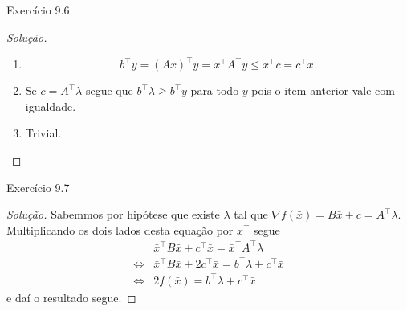 \documentclass[12pt,twoside,a4paper]{article}
\begin{document}
\begin{problema}
Exercício 9.6  
\end{problema}
\begin{proof}[Solução]
  \begin{enumerate}
  \item
    \[b^\top y = (Ax)^\top y = x^\top A^\top y  \leq x^\top c= c^\top x.\]
   \item Se \(c=A^\top \lambda\) segue que \(b^\top \lambda \geq b^\top y\) para
     todo \(y\) pois o item anterior vale com igualdade.
   \item Trivial.
    \end{enumerate}
\end{proof}
\begin{problema}
Exercício 9.7
\end{problema}
\begin{proof}[Solução]
 Sabemmos por hipótese que existe \(\lambda\) tal que \(\nabla
 f(\bar{x})=B\bar{x} + c = A^\top \lambda\). Multiplicando os dois lados desta
 equação por \(x^\top\) segue
 \begin{align*}
   & \bar{x}^\top B \bar{x} + c^\top \bar{x}= \bar{x}^\top A^\top\lambda \\\iff & \bar{x}^\top B \bar{x} + 2c^\top \bar{x}=b^\top\lambda + c^\top \bar{x} \\\iff & 2 f(\bar{x})= b^\top \lambda + c^\top \bar{x}
 \end{align*}
e daí o resultado segue. 
\end{proof}
\end{document}
